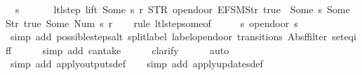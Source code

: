 \begin{isabellebody}
\ \ {\isachardoublequoteopen}s\ {\isasymin}\ {\isacharbraceleft}{}{\isacharcomma}\ {}{\isacharcomma}\ {}{\isacharcomma}\ {}{\isacharbraceright}\ {\isasymLongrightarrow}\ ltl{\isacharunderscore}step\ lift\ {\isacharparenleft}Some\ s{\isacharparenright}\ r\ {\isacharparenleft}STR\ {\isacharprime}{\isacharprime}opendoor{\isacharprime}{\isacharprime}{\isacharcomma}\ {\isacharbrackleft}EFSM{\isachardot}Str\ {\isacharprime}{\isacharprime}true{\isacharprime}{\isacharprime}{\isacharbrackright}{\isacharparenright}\ {\isacharequal}\ {\isacharparenleft}Some\ s{\isacharcomma}\ {\isacharbrackleft}Some\ {\isacharparenleft}Str\ {\isacharprime}{\isacharprime}true{\isacharprime}{\isacharprime}{\isacharparenright}{\isacharcomma}\ Some\ {\isacharparenleft}Num\ {\isacharparenleft}s{\isacharminus}{}{\isacharparenright}{\isacharparenright}{\isacharbrackright}{\isacharcomma}\ r{\isacharparenright}{\isachardoublequoteclose}\isanewline
%
\isadelimproof
\ \ %
\endisadelimproof
%
\isatagproof
{}\isamarkupfalse%
\ {\isacharparenleft}rule\ ltl{\isacharunderscore}step{\isacharunderscore}some{\isacharbrackleft}of\ {\isacharunderscore}\ {\isacharunderscore}\ {\isacharunderscore}\ {\isacharunderscore}\ {\isacharunderscore}\ s\ {\isachardoublequoteopen}opendoor\ {\isacharparenleft}s{\isacharminus}{}{\isacharparenright}{\isachardoublequoteclose}{\isacharbrackright}{\isacharparenright}\isanewline
\ \ \ \ \isamarkupfalse%
\ {\isacharparenleft}simp\ add{\isacharcolon}\ possible{\isacharunderscore}steps{\isacharunderscore}alt{}\ split{\isacharunderscore}label\ label{\isacharunderscore}opendoor\ transitions\ Abs{\isacharunderscore}ffilter\ set{\isacharunderscore}eq{\isacharunderscore}iff{\isacharparenright}\isanewline
\ \ \ \ \isamarkupfalse%
\ {\isacharparenleft}simp\ add{\isacharcolon}\ can{\isacharunderscore}take{\isacharparenright}\isanewline
\ \ \ \ \isamarkupfalse%
\ clarify\isanewline
\ \ \ \ \isamarkupfalse%
\ auto{\isacharbrackleft}{}{\isacharbrackright}\isanewline
\ \ \ \isamarkupfalse%
\ {\isacharparenleft}simp\ add{\isacharcolon}\ apply{\isacharunderscore}outputs{\isacharunderscore}def{\isacharparenright}\isanewline
\ \ \isamarkupfalse%
\ {\isacharparenleft}simp\ add{\isacharcolon}\ apply{\isacharunderscore}updates{\isacharunderscore}def{\isacharparenright}%
\endisatagproof
{\isafoldproof}%
%
\isadelimproof
\isanewline
%
\endisadelimproof
\isanewline
{}\isamarkupfalse%

\end{isabellebody}
